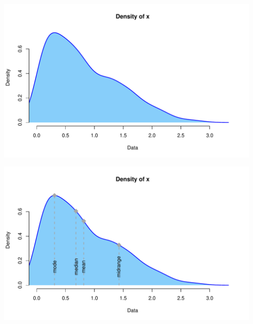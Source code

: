 \documentclass[aspectratio=169]{beamer}
\theoremstyle{principle}
\begin{document}
\begin{frame}
\begin{center}
\includegraphics[scale=0.65]{density.pdf}
\end{center}
\end{frame}

\begin{frame}
\begin{center}
\includegraphics[scale=0.65]{density_w_centrals.pdf}
\end{center}
\end{frame}

\end{document}
